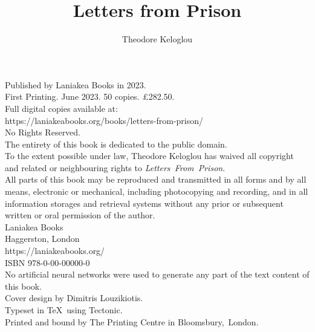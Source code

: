 \documentclass{book}
\title{Letters from Prison}
\author{Theodore Keloglou}
\date{}
\begin{document}
\frontmatter %
\pagestyle{empty} %

\maketitle

\vspace*{\fill}
\begin{center}
{
    \small
    Published by Laniakea Books in 2023.\\
    \vspace{1em}
    First Printing. June 2023. 50 copies. £282.50.\\
    \vspace{1em}
    Full digital copies available at:\\
    https://laniakeabooks.org/books/letters-from-prison/\\
    \vspace{1em}
    No Rights Reserved.\\
    \vspace{1em}
    The entirety of this book is dedicated to the public domain.\\
    \vspace{1em}
    To the extent possible under law, Theodore Keloglou has waived all copyright and related or neighbouring rights to \textit{Letters~From~Prison}.\\
    \vspace{1em}
    All parts of this book may be reproduced and transmitted in all forms and by all means, electronic or mechanical, including photocopying and recording, and in all information storages and retrieval systems without any prior or subsequent written or oral permission of the author.\\
    \vspace{1em}
    Laniakea Books\\
    Haggerston, London\\
    https://laniakeabooks.org/\\
    \vspace{1em}
    ISBN 978-0-00-00000-0\\
    \vspace{1em}
    No artificial neural networks were used to generate any part of the text content of this book.\\
    \vspace{1em}
    Cover design by Dimitris Louzikiotis.\\
    Typeset in \TeX\ using Tectonic.\\
    Printed and bound by The Printing Centre in Bloomsbury,~London.
}
\end{center}
\end{document}
